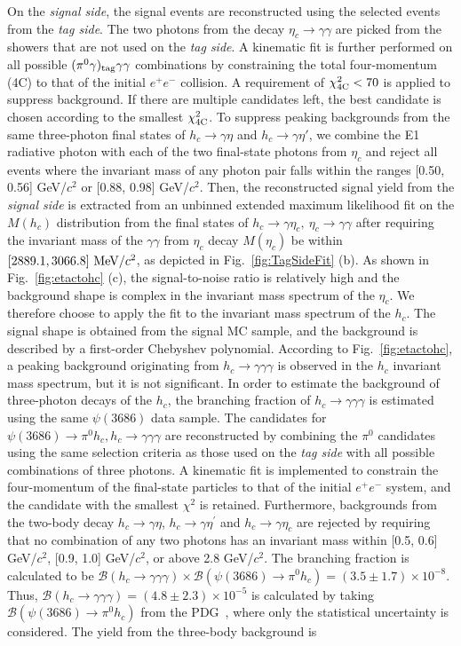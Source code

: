 \documentclass[twocolumn,showpacs,aps,prl]{revtex4-2}
\newcommand{\psip}{\psi(3686)}
\begin{document}
On the \textit{signal side}, the signal events are reconstructed using the selected events from the \textit{tag side}. The two photons from the decay $\eta_c \to \gamma \gamma$ are picked from the showers that are not used on the \textit{tag side}. A kinematic fit is further performed on all possible $(\pi^0 \gamma)_{\rm tag} \gamma \gamma$ combinations by constraining the total four-momentum (4C) to that of the initial $e^+e^-$ collision. A requirement of $\chi_{\rm 4C}^2 < 70$ is applied to suppress background. If there are multiple candidates left, the best candidate is chosen according to the smallest $\chi^2_{\rm 4C}$. To suppress peaking backgrounds from the same three-photon final states of \(h_c \to \gamma \eta\) and \(h_c \to \gamma \eta'\), we combine the E1 radiative photon with each of the two final-state photons from $\eta_c$ and reject all events where the invariant mass of any photon pair falls within the ranges [0.50, 0.56] GeV/\(c^2\) or [0.88, 0.98] GeV/\(c^2\). Then, the reconstructed signal yield from the \textit{signal side} is extracted from an unbinned extended maximum likelihood fit on the $M(h_c)$ distribution from the final states of $h_c \to \gamma \eta_c,~\eta_c \to \gamma \gamma$ after requiring the invariant mass of the $\gamma \gamma$ from $\eta_c$ decay $M(\eta_c)$ be within $[2889.1, 3066.8]~{\rm MeV}/c^2$, as depicted in Fig.~\ref{fig:TagSideFit} (b).  As shown in Fig.~\ref{fig:etactohc} (c), the signal-to-noise ratio is relatively high and the background shape is complex in the invariant mass spectrum of the $\eta_c$.  We therefore choose to apply the fit to the invariant mass spectrum of the $h_c$. The signal shape is obtained from the signal MC sample, and the background is described by a first-order Chebyshev polynomial. According to Fig.~\ref{fig:etactohc}, a peaking background originating from $h_{c} \to \gamma \gamma \gamma$ is observed in the $h_c$ invariant mass spectrum, but it is not significant. In order to estimate the background of three-photon decays of the $h_c$, the branching fraction of $h_{c} \to \gamma \gamma \gamma$ is estimated using the same $\psi(3686)$ data sample. The candidates for $\psip \to \pi^0 h_c,h_c\to\gamma\gamma\gamma$ are reconstructed by combining the $\pi^0$ candidates using the same selection criteria as those used on the \textit{tag side} with all possible combinations of three photons. A kinematic fit is implemented to constrain the four-momentum of the final-state particles to that of the initial $e^+e^-$ system, and the candidate with the smallest $\chi^2$ is retained. Furthermore, backgrounds from the two-body decay $h_c \to \gamma \eta$, $h_c \to \gamma \eta^{\prime}$ and $h_c \to \gamma \eta_{c}$ are rejected by requiring that no combination of any two photons has an invariant mass within [0.5, 0.6] GeV/$c^2$, [0.9, 1.0] GeV/$c^2$, or above 2.8 GeV/$c^2$. The branching fraction is calculated to be $\mathcal{B}(h_c \to \gamma \gamma \gamma) \times \mathcal{B}(\psip \to \pi^0 h_c) = (3.5 \pm 1.7)\times 10^{-8}$. Thus, $\mathcal{B}(h_c \to \gamma \gamma \gamma) = (4.8 \pm 2.3) \times 10^{-5}$ is calculated by taking $\mathcal{B}(\psip \to \pi^0 h_c)$ from the PDG~\cite{ParticleDataGroup:2024cfk}, where only the statistical uncertainty is considered. The yield from the three-body background is 
\end{document}
